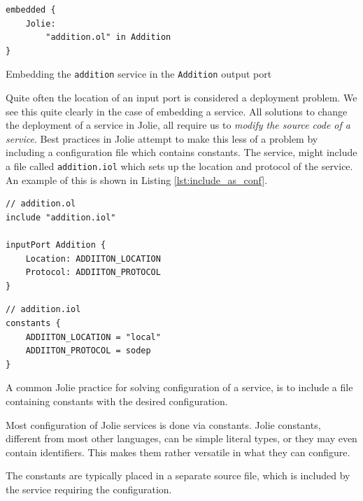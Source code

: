\begin{listing}[H]
\begin{verbatim}
embedded {
    Jolie:
        "addition.ol" in Addition
}
\end{verbatim}

\caption{Embedding the \texttt{addition} service in the
    \texttt{Addition} output port}

\label{lst:simple_embedding}

\end{listing}

Quite often the location of an input port is considered a deployment problem.
We see this quite clearly in the case of embedding a service. All solutions to
change the deployment of a service in Jolie, all require us to \emph{modify the
    source code of a service}.  Best practices in Jolie attempt to make this
    less of a problem by including a configuration file which contains
    constants. The  service, might include a file called
    \verb!addition.iol! which sets up the location and protocol of the service.
    An example of this is shown in Listing \ref{lst:include_as_conf}.

\begin{listing}[H]
\begin{multicols}{2}

\begin{verbatim}
// addition.ol
include "addition.iol"

inputPort Addition {
    Location: ADDIITON_LOCATION
    Protocol: ADDIITON_PROTOCOL
}
\end{verbatim}

\columnbreak

\begin{verbatim}
// addition.iol
constants {
    ADDIITON_LOCATION = "local"
    ADDIITON_PROTOCOL = sodep
}
\end{verbatim}

\end{multicols}

\caption{A common Jolie practice for solving configuration of a service, is to
    include a file containing constants with the desired configuration.}

\label{lst:include_as_conf}

\end{listing}

\begin{observation}

Most configuration of Jolie services is done via constants. Jolie constants,
different from most other languages, can be simple literal types, or they
may even contain identifiers. This makes them rather versatile in what
they can configure.

The constants are typically placed in a separate source file, which is
included by the service requiring the configuration.

\end{observation}

